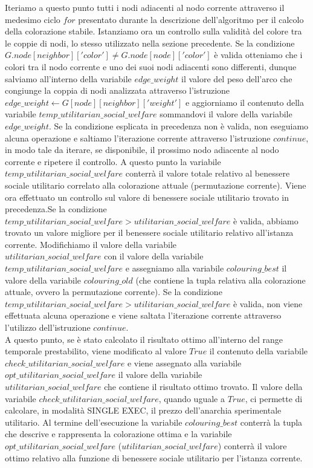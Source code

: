 Iteriamo a questo punto tutti i nodi adiacenti al nodo corrente attraverso il medesimo ciclo $for$ presentato durante la descrizione dell'algoritmo per il calcolo della colorazione stabile. Istanziamo ora un controllo sulla validità del colore tra le coppie di nodi, lo stesso utilizzato nella sezione precedente. Se la condizione $G.node[neighbor]['color'] \neq G.node[node]['color']$ è valida otteniamo che i colori tra il nodo corrente e uno dei suoi nodi adiacenti sono differenti, dunque salviamo all'interno della variabile $edge\_weight$ il valore del peso dell'arco che congiunge la coppia di nodi analizzata attraverso l'istruzione $edge\_weight\gets G[node][neighbor]['weight']$ e aggiorniamo il contenuto della variabile $temp\_utilitarian\_social\_welfare$ sommandovi il valore della variabile $edge\_weight$. Se la condizione esplicata in precedenza non è valida, non eseguiamo alcuna operazione e saltiamo l'iterazione corrente attraverso l'istruzione $continue$, in modo tale da iterare, se disponibile, il prossimo nodo adiacente al nodo corrente e ripetere il controllo. A questo punto la variabile $temp\_utilitarian\_social\_welfare$ conterrà il valore totale relativo al benessere sociale utilitario correlato alla colorazione attuale (permutazione corrente). Viene ora effettuato un controllo sul valore di benessere sociale utilitario trovato in precedenza.Se la condizione \\
$temp\_utilitarian\_social\_welfare > utilitarian\_social\_welfare$ è valida, abbiamo trovato un valore migliore per il benessere sociale utilitario relativo all'istanza corrente. Modifichiamo il valore della variabile\\
$utilitarian\_social\_welfare$ con il valore della variabile \\
$temp\_utilitarian\_social\_welfare$ e assegniamo alla variabile $colouring\_best$ il valore della variabile $colouring\_old$ (che contiene la tupla relativa alla colorazione attuale, ovvero la permutazione corrente). Se la condizione \\
$temp\_utilitarian\_social\_welfare > utilitarian\_social\_welfare$ è valida, non viene effettuata alcuna operazione e viene saltata l'iterazione corrente attraverso l'utilizzo dell'istruzione $continue$.\\
A questo punto, se è stato calcolato il risultato ottimo all'interno del range temporale prestabilito, viene modificato al valore $True$ il contenuto della variabile $check\_utilitarian\_social\_welfare$ e viene assegnato alla variabile $opt\_utilitarian\_social\_welfare$ il valore della variabile \\
$utilitarian\_social\_welfare$ che contiene il risultato ottimo trovato. Il valore della variabile $check\_utilitarian\_social\_welfare$, quando uguale a $True$, ci permette di calcolare, in modalità SINGLE EXEC, il prezzo dell'anarchia sperimentale utilitario. Al termine dell'esecuzione la variabile $colouring\_best$ conterrà la tupla che descrive e rappresenta la colorazione ottima e la variabile \\
$opt\_utilitarian\_social\_welfare$ ($utilitarian\_social\_welfare$) conterrà il valore ottimo relativo alla funzione di benessere sociale utilitario per l'istanza corrente.

